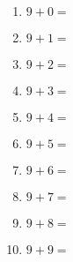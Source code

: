 \documentclass{article}
\begin{document}
\begin{multicols}{5}
\begin{enumerate}
\item $9 + 0 =$
\item $9 + 1 =$
\item $9 + 2 =$
\item $9 + 3 =$
\item $9 + 4 =$
\item $9 + 5 =$
\item $9 + 6 =$
\item $9 + 7 =$
\item $9 + 8 =$
\item $9 + 9 =$

\end{enumerate}
\end{multicols}
\end{document}
